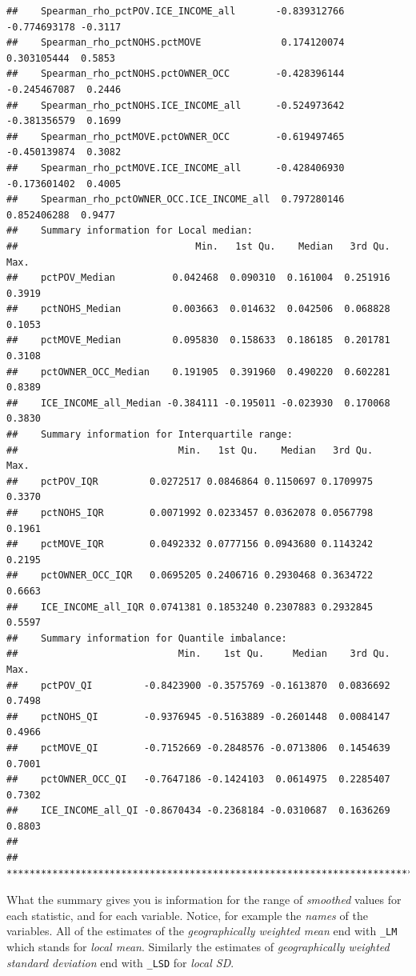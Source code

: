 \documentclass[
]{book}
\begin{document}
\begin{verbatim}
##    Spearman_rho_pctPOV.ICE_INCOME_all       -0.839312766 -0.774693178 -0.3117
##    Spearman_rho_pctNOHS.pctMOVE              0.174120074  0.303105444  0.5853
##    Spearman_rho_pctNOHS.pctOWNER_OCC        -0.428396144 -0.245467087  0.2446
##    Spearman_rho_pctNOHS.ICE_INCOME_all      -0.524973642 -0.381356579  0.1699
##    Spearman_rho_pctMOVE.pctOWNER_OCC        -0.619497465 -0.450139874  0.3082
##    Spearman_rho_pctMOVE.ICE_INCOME_all      -0.428406930 -0.173601402  0.4005
##    Spearman_rho_pctOWNER_OCC.ICE_INCOME_all  0.797280146  0.852406288  0.9477
##    Summary information for Local median:
##                               Min.   1st Qu.    Median   3rd Qu.   Max.
##    pctPOV_Median          0.042468  0.090310  0.161004  0.251916 0.3919
##    pctNOHS_Median         0.003663  0.014632  0.042506  0.068828 0.1053
##    pctMOVE_Median         0.095830  0.158633  0.186185  0.201781 0.3108
##    pctOWNER_OCC_Median    0.191905  0.391960  0.490220  0.602281 0.8389
##    ICE_INCOME_all_Median -0.384111 -0.195011 -0.023930  0.170068 0.3830
##    Summary information for Interquartile range:
##                            Min.   1st Qu.    Median   3rd Qu.   Max.
##    pctPOV_IQR         0.0272517 0.0846864 0.1150697 0.1709975 0.3370
##    pctNOHS_IQR        0.0071992 0.0233457 0.0362078 0.0567798 0.1961
##    pctMOVE_IQR        0.0492332 0.0777156 0.0943680 0.1143242 0.2195
##    pctOWNER_OCC_IQR   0.0695205 0.2406716 0.2930468 0.3634722 0.6663
##    ICE_INCOME_all_IQR 0.0741381 0.1853240 0.2307883 0.2932845 0.5597
##    Summary information for Quantile imbalance:
##                            Min.    1st Qu.     Median    3rd Qu.   Max.
##    pctPOV_QI         -0.8423900 -0.3575769 -0.1613870  0.0836692 0.7498
##    pctNOHS_QI        -0.9376945 -0.5163889 -0.2601448  0.0084147 0.4966
##    pctMOVE_QI        -0.7152669 -0.2848576 -0.0713806  0.1454639 0.7001
##    pctOWNER_OCC_QI   -0.7647186 -0.1424103  0.0614975  0.2285407 0.7302
##    ICE_INCOME_all_QI -0.8670434 -0.2368184 -0.0310687  0.1636269 0.8803
## 
##    ************************************************************************
\end{verbatim}

What the summary gives you is information for the range of \emph{smoothed} values for each statistic, and for each variable. Notice, for example the \emph{names} of the variables. All of the estimates of the \emph{geographically weighted mean} end with \texttt{\_LM} which stands for \emph{local mean}. Similarly the estimates of \emph{geographically weighted standard deviation} end with \texttt{\_LSD} for \emph{local SD}.
\end{document}
